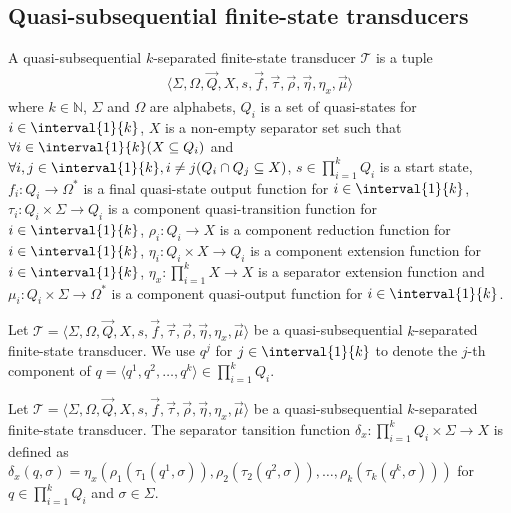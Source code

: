 \subsection{Quasi-subsequential finite-state transducers}

\begin{definition}
	A quasi-subsequential $k$-separated finite-state transducer $\mathcal{T}$
	is a tuple
	\begin{align*}
		\langle \Sigma, \Omega, \vec{Q}, X, s, \vec{f}, \vec{\tau},
		\vec{\rho}, \vec{\eta}, \eta_x, \vec{\mu} \rangle
	\end{align*}
	where $k \in \mathbb{N}$, $\Sigma$ and $\Omega$ are alphabets, $Q_i$ is a
	set of quasi-states for $i \in \interval{1}{k}$, $X$ is a non-empty
	separator set such that $\forall i \in \interval{1}{k} (X \subseteq Q_i)$
	and $\forall i, j \in \interval{1}{k}, i \neq j (Q_i \cap Q_j \subseteq X)$,
	$s \in \prod_{i=1}^k{Q_i}$ is a start state, $f_i : Q_i \rightarrow
	\Omega^*$ is a final quasi-state output function for $i \in
	\interval{1}{k}$, $\tau_i : Q_i \times \Sigma \rightarrow Q_i$ is a
	component quasi-transition function for $i \in \interval{1}{k}$, $\rho_i :
	Q_i \rightarrow X$ is a component reduction function for $i \in
	\interval{1}{k}$, $\eta_i : Q_i \times X \rightarrow Q_i$ is a component
	extension function for $i \in \interval{1}{k}$, $\eta_x : \prod_{i=1}^k{X}
	\rightarrow X$ is a separator extension function and $\mu_i : Q_i \times
	\Sigma \rightarrow \Omega^*$ is a component quasi-output function for $i
	\in \interval{1}{k}$.
\end{definition}

\begin{remark}
	Let $\mathcal{T} = \langle \Sigma, \Omega, \vec{Q}, X, s, \vec{f},
	\vec{\tau}, \vec{\rho}, \vec{\eta}, \eta_x, \vec{\mu} \rangle$ be a
	quasi-subsequential $k$-separated finite-state transducer. We use $q^j$ for
	$j \in \interval{1}{k}$ to denote the $j$-th component of $q = \langle q^1,
	q^2, \ldots, q^k \rangle \in \prod_{i=1}^k{Q_i}$.
\end{remark}

\begin{definition}
	Let $\mathcal{T} = \langle \Sigma, \Omega, \vec{Q}, X, s, \vec{f},
	\vec{\tau}, \vec{\rho}, \vec{\eta}, \eta_x, \vec{\mu} \rangle$ be a
	quasi-subsequential $k$-separated finite-state transducer. The separator
	tansition function $\delta_x : \prod_{i=1}^k{Q_i} \times \Sigma \rightarrow
	X$ is defined as $\delta_x(q, \sigma) = \eta_x(\rho_1(\tau_1(q^1, \sigma)),
	\rho_2(\tau_2(q^2, \sigma)), \ldots, \rho_k(\tau_k(q^k, \sigma)))$ for $q
	\in \prod_{i=1}^k{Q_i}$ and $\sigma \in \Sigma$.
\end{definition}

